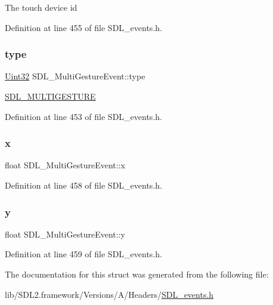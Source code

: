 The touch device id 

Definition at line 455 of file S\+D\+L\+\_\+events.\+h.

\mbox{\label{struct_s_d_l___multi_gesture_event_ab0c7adc9a3f71cc3532bfe0ff8cc6120}} 
\subsubsection{\texorpdfstring{type}{type}}
{\footnotesize\ttfamily \mbox{\hyperlink{_s_d_l__stdinc_8h_add440eff171ea5f55cb00c4a9ab8672d}{Uint32}} S\+D\+L\+\_\+\+Multi\+Gesture\+Event\+::type}

\mbox{\hyperlink{_s_d_l__events_8h_a3b589e89be6b35c02e0dd34a55f3fccaaa225e29d8bf6e619dda824c81826c929}{S\+D\+L\+\_\+\+M\+U\+L\+T\+I\+G\+E\+S\+T\+U\+RE}} 

Definition at line 453 of file S\+D\+L\+\_\+events.\+h.

\mbox{\label{struct_s_d_l___multi_gesture_event_a1708fc3c788fd12cc0beb5dc05cf31ca}} 
\subsubsection{\texorpdfstring{x}{x}}
{\footnotesize\ttfamily float S\+D\+L\+\_\+\+Multi\+Gesture\+Event\+::x}



Definition at line 458 of file S\+D\+L\+\_\+events.\+h.

\mbox{\label{struct_s_d_l___multi_gesture_event_a264602b9c5cc027eb6a283adda428454}} 
\subsubsection{\texorpdfstring{y}{y}}
{\footnotesize\ttfamily float S\+D\+L\+\_\+\+Multi\+Gesture\+Event\+::y}



Definition at line 459 of file S\+D\+L\+\_\+events.\+h.



The documentation for this struct was generated from the following file\+:\begin{DoxyCompactItemize}
\item 
lib/\+S\+D\+L2.\+framework/\+Versions/\+A/\+Headers/\mbox{\hyperlink{_s_d_l__events_8h}{S\+D\+L\+\_\+events.\+h}}\end{DoxyCompactItemize}

